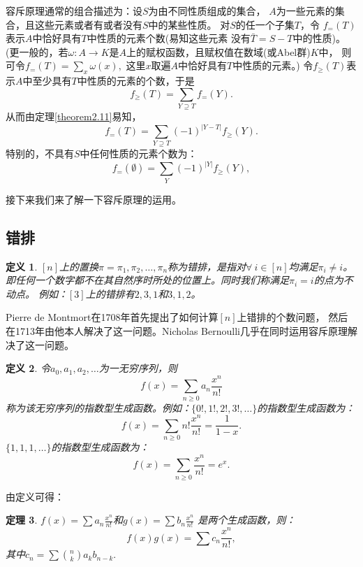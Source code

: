 \documentclass[a4paper,11pt,twoside]{book}
\newtheorem{thm}{定理}[section]
\newtheorem{defi}[thm]{定义}
\begin{document}
容斥原理通常的组合描述为：设$S$为由不同性质组成的集合，
$A$为一些元素的集合，且这些元素或者有或者没有$S$中的某些性质。
对$S$的任一个子集$T$，令
$f_=(T)$表示$A$中恰好具有$T$中性质的元素个数(易知这些元素
没有$\bar{T}=S-T$中的性质)。(更一般的，若$\omega\colon A\rightarrow
K$是$A$上的赋权函数，且赋权值在数域(或Abel群)$K$中，
则可令$f_{=}(T)=\sum_x \omega(x),$
这里$x$取遍$A$中恰好具有$T$中性质的元素。)
令$f_{\geq}(T)$表示$A$中至少具有$T$中性质的元素的个数，于是
\begin{equation}\label{equation3}
f_{\geq}(T)=\sum_{Y\supseteq T}f_{=} (Y).
\end{equation}
从而由定理\ref{theorem2.11}易知，
\begin{equation}\label{equation4}
f_{=}(T)=\sum_{Y\supseteq T}(-1)^{|Y-T|}f_{\geq}(Y).
\end{equation}
特别的，不具有$S$中任何性质的元素个数为：
\begin{equation}\label{equation5}
f_{=}(\emptyset)=\sum_Y (-1)^{|Y|} f_{\geq}(Y),
\end{equation}

接下来我们来了解一下容斥原理的运用。

\subsection{错排}

\begin{defi}
$[n]$上的置换$\pi=\pi_1,\pi_2,\ldots,
\pi_n$称为错排，是指对$\forall\  i\in [n]$均满足$\pi_i\ne
i$。即任何一个数字都不在其自然序时所处的位置上。同时我们称满足$\pi_i=i$的点为不动点。
例如：$[3]$上的错排有$2,3,1$和$3,1,2$。
\end{defi}


Pierre de Montmort在1708年首先提出了如何计算$[n]$上错排的个数问题，
然后在1713年由他本人解决了这一问题。Nicholas
Bernoulli几乎在同时运用容斥原理解决了这一问题。


\begin{defi}
令$a_0,a_1,a_2,\ldots$为一无穷序列，则
$$f(x)=\sum_{n\geq0}a_n\frac{x^n}{n!}$$
称为该无穷序列的指数型生成函数。例如：$\{0!,1!,2!,3!,\ldots\}$的指数型生成函数为：
$$f(x)=\sum_{n\ge0}n!\frac{x^n}{n!}=\frac{1}{1-x}.$$
$\{1,1,1,\ldots\}$的指数型生成函数为：
$$f(x)=\sum_{n\ge0}\frac{x^n}{n!}=e^x.$$
\end{defi}
由定义可得：

\begin{thm}
$f(x)=\sum a_n\frac{x^n}{n!}$和$g(x)=\sum b_n\frac{x^n}{n!}$
是两个生成函数，则：
$$f(x)g(x)=\sum c_n\frac{x^n}{n!},$$
其中$c_n=\sum{n\choose k}a_kb_{n-k}.$
\end{thm}
\end{document}
